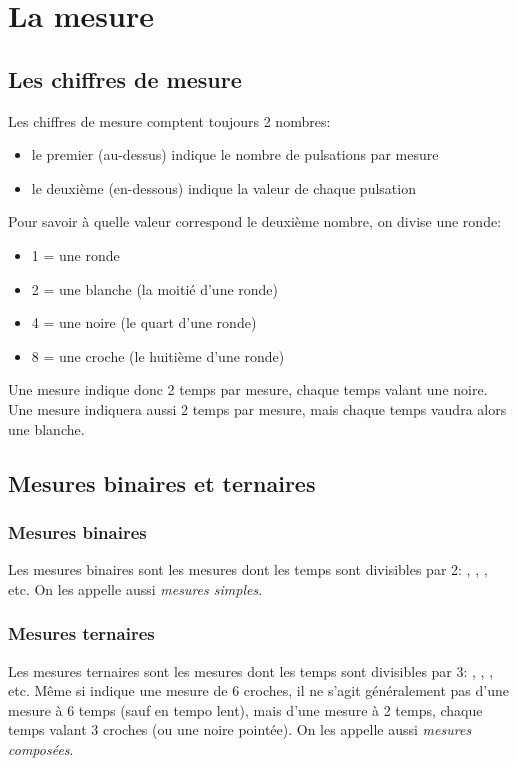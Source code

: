 \documentclass[11pt,a4paper]{scrreprt}
\begin{document}
\chapter{La mesure}
\section{Les chiffres de mesure}
Les chiffres de mesure comptent toujours 2 nombres:
\begin{itemize}
\item le premier (au-dessus) indique le nombre de pulsations par mesure
\item le deuxième (en-dessous) indique la valeur de chaque pulsation
\end{itemize}

Pour savoir à quelle valeur correspond le deuxième nombre, on divise une ronde:
\begin{itemize}
\item 1 = une ronde
\item 2 = une blanche (la moitié d'une ronde)
\item 4 = une noire (le quart d'une ronde)
\item 8 = une croche (le huitième d'une ronde)
\end{itemize}
Une mesure  indique donc 2 temps par mesure, chaque temps valant une noire. Une mesure  indiquera aussi 2 temps par mesure, mais chaque temps vaudra alors une blanche.

\section{Mesures binaires et ternaires}
\subsection{Mesures binaires}
Les mesures binaires sont les mesures dont les temps sont divisibles par 2: , , , etc. On les appelle aussi \emph{mesures simples}.

\subsection{Mesures ternaires}
Les mesures ternaires sont les mesures dont les temps sont divisibles par 3: , , , etc. Même si  indique une mesure de 6 croches, il ne s'agit généralement pas d'une mesure à 6 temps (sauf en tempo lent), mais d'une mesure à 2 temps, chaque temps valant 3 croches (ou une noire pointée). On les appelle aussi \emph{mesures composées}.
\end{document}
